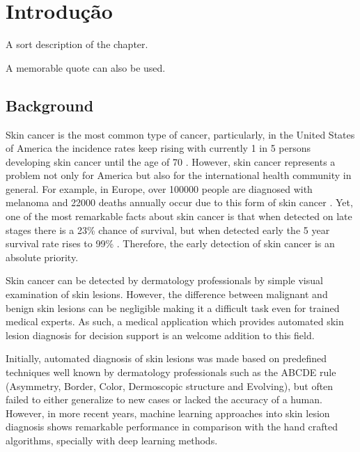 

\chapter{Introdução}
\label{chapter:introduction}

\begin{introduction}
A sort description of the chapter.

A memorable quote can also be used.
\end{introduction}

\section{Background}
Skin cancer is the most common type of cancer, particularly, in the United States of America the incidence rates keep rising with currently 1 in 5 persons developing skin cancer until the age of 70 \cite{Foundation2019}. However, skin cancer represents a problem not only for America but also for the international health community in general. For example, in Europe, over 100000 people are diagnosed with melanoma and 22000 deaths annually occur due to this form of skin cancer \cite{Bray2018}.  Yet, one of the most remarkable facts about skin cancer is that when detected on late stages there is a 23\% chance of survival, but when detected early the 5 year survival rate rises to 99\% \cite{Foundation2019}. Therefore, the early detection of skin cancer is an absolute priority. \par
Skin cancer can be detected by dermatology professionals by simple visual examination of skin lesions. However, the difference between malignant and benign skin lesions can be negligible making it a difficult task even for trained medical experts. As such, a medical application which provides automated skin lesion diagnosis for decision support is an welcome addition to this field. \par
Initially, automated diagnosis of skin lesions was made based on predefined techniques well known by dermatology professionals such as the ABCDE rule (Asymmetry, Border, Color, Dermoscopic structure and Evolving), but often failed to either generalize to new cases or lacked the accuracy of a human. However, in more recent years, machine learning approaches into skin lesion diagnosis shows remarkable performance in comparison with the hand crafted algorithms, specially with deep learning methods\cite{Esteva2017}\cite{Haenssle2018}. 
